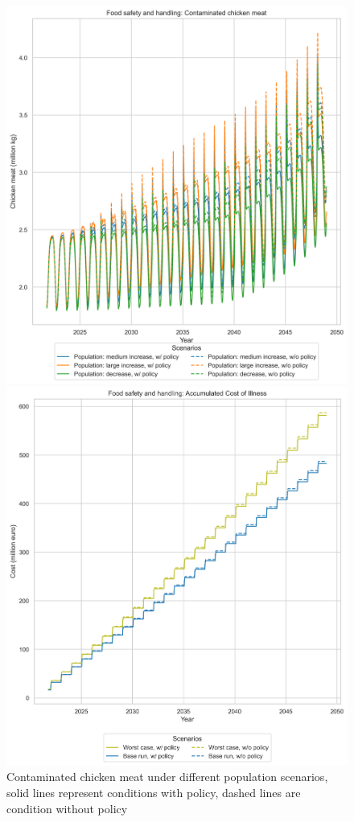 \begin{figure}[h!]
    \centering
    \begin{minipage}{0.45\textwidth}
        \centering
        \includegraphics[width=1\textwidth]{images/fs_Population_meat.png}
        \caption{Contaminated chicken meat under different population scenarios, solid lines represent conditions with policy, dashed lines are condition without policy}
        \label{fig:fs_pop_meat}
    \end{minipage}\hfill
    \begin{minipage}{0.45\textwidth}
        \centering
        \includegraphics[width=1\textwidth]{images/fs_Base and Worst Case_acoi.png} 

\end{minipage}
\end{figure}

